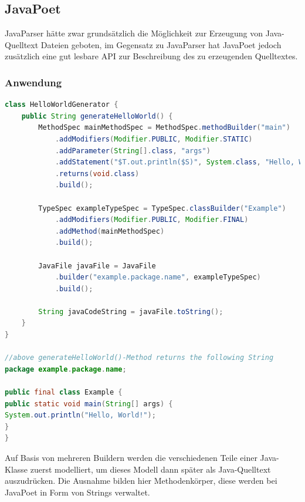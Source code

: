 \documentclass[12pt,oneside,a4paper,parskip]{scrbook}
\begin{document}
\subsection{JavaPoet}

JavaParser hätte zwar grundsätzlich die Möglichkeit zur Erzeugung von Java-Quelltext Dateien geboten, im Gegensatz zu JavaParser hat JavaPoet jedoch zusätzlich eine gut lesbare API zur Beschreibung des zu erzeugenden Quelltextes.

\subsubsection{Anwendung}

\begin{lstlisting}[label=lst:jpoet,
language=java,
firstnumber=1,
caption={Java-Quelltext zur Erzeugung eines \glqq Hallo, Welt!\grqq -Beispiels, angelehnt an das \glqq Hello, JavaPoet!\grqq{} Beispiel in der README.md von\,\cite{javapoet2017}.}]
class HelloWorldGenerator {
	public String generateHelloWorld() {
		MethodSpec mainMethodSpec = MethodSpec.methodBuilder("main")
			.addModifiers(Modifier.PUBLIC, Modifier.STATIC)
			.addParameter(String[].class, "args")
			.addStatement("$T.out.println($S)", System.class, "Hello, World!")
			.returns(void.class)
			.build();

		TypeSpec exampleTypeSpec = TypeSpec.classBuilder("Example")
			.addModifiers(Modifier.PUBLIC, Modifier.FINAL)
			.addMethod(mainMethodSpec)
			.build();
		
		JavaFile javaFile = JavaFile
			.builder("example.package.name", exampleTypeSpec)
			.build();

		String javaCodeString = javaFile.toString();
	}
}

//above generateHelloWorld()-Method returns the following String
package example.package.name;

public final class Example {
public static void main(String[] args) {
System.out.println("Hello, World!");
}
}

\end{lstlisting}

Auf Basis von mehreren Buildern werden die verschiedenen Teile einer Java-Klasse zuerst modelliert, um dieses Modell dann später als Java-Quelltext auszudrücken. Die Ausnahme bilden hier Methodenkörper, diese werden bei JavaPoet in Form von Strings verwaltet.
\end{document}

